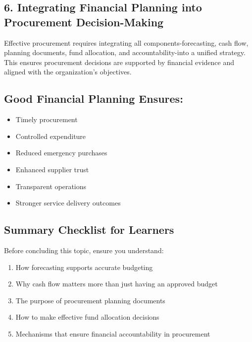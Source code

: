 \documentclass[10pt]{article}
\begin{document}
\subsection*{6. Integrating Financial Planning into Procurement Decision-Making}
Effective procurement requires integrating all components-forecasting, cash flow, planning documents, fund allocation, and accountability-into a unified strategy. This ensures procurement decisions are supported by financial evidence and aligned with the organization's objectives.

\subsection*{Good Financial Planning Ensures:}
\begin{itemize}
  \item Timely procurement
  \item Controlled expenditure
  \item Reduced emergency purchases
  \item Enhanced supplier trust
  \item Transparent operations
  \item Stronger service delivery outcomes
\end{itemize}

\subsection*{Summary Checklist for Learners}
Before concluding this topic, ensure you understand:\\
\begin{enumerate}
	\item How forecasting supports accurate budgeting
	\item Why cash flow matters more than just having an approved budget
	\item The purpose of procurement planning documents
	\item How to make effective fund allocation decisions
	\item Mechanisms that ensure financial accountability in procurement
\end{enumerate}
\end{document}
